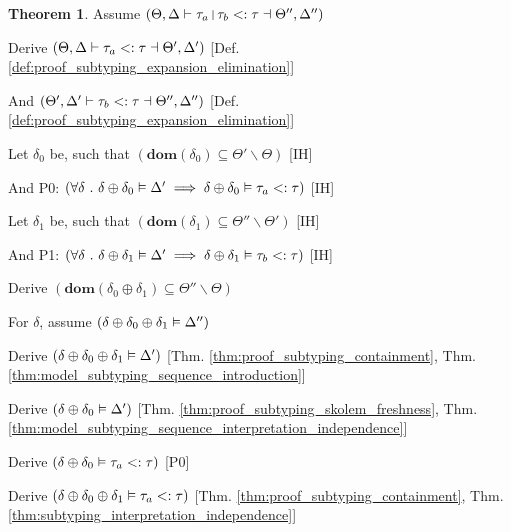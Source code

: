 \documentclass[acmsmall]{acmart}
\theoremstyle{definition}
\newtheorem{theorem}{Theorem}[section]
\begin{document}
\begin{theorem}

  \item \N Assume $(
    \Theta, \Delta \entails
    \tau_a\J{|}\tau_b \subtypes \tau
    \given \Theta'', \Delta'' 
  )$

  \item \I \N Derive $(
    \Theta, \Delta \vdash
    \tau_a <: \tau
    \dashv \Theta', \Delta'
  )$ [Def. \ref{def:proof_subtyping_expansion_elimination}]

  \item \I \N And $(
    \Theta', \Delta' \vdash
    \tau_b <: \tau
    \dashv \Theta'', \Delta''
  )$ [Def. \ref{def:proof_subtyping_expansion_elimination}]

  \item \I \N Let $\delta_0$ be, such that $(
    \textbf{dom}(\delta_0) \subseteq \Theta' \backslash \Theta
  )$ [IH]
  \item \I \N And P0: $(
    \forall \delta \ .\  
    \delta \oplus \delta_0 \vDash \Delta' 
    \implies 
    \delta \oplus \delta_0 \vDash \tau_a <: \tau
  )$ [IH]

  \item \I \N Let $\delta_1$ be, such that $(
    \textbf{dom}(\delta_1) \subseteq \Theta'' \backslash \Theta'
  )$ [IH]
  \item \I \N And P1: $(
    \forall \delta \ .\  
    \delta \oplus \delta_1 \vDash \Delta' 
    \implies 
    \delta \oplus \delta_1 \vDash \tau_b <: \tau
  )$ [IH]

  \item \I \N Derive $(
    \textbf{dom}(\delta_0 \oplus \delta_1) \subseteq \Theta'' \backslash \Theta
  )$
  \item \I \N For $\delta$, 
    assume $(\delta \oplus \delta_0 \oplus \delta_1 \vDash \Delta'')$

  \item \I\I \N Derive $(\delta \oplus \delta_0 \oplus \delta_1 \vDash \Delta')$
    [Thm. \ref{thm:proof_subtyping_containment}, Thm. \ref{thm:model_subtyping_sequence_introduction}]
  \item \I\I \N Derive $(\delta \oplus \delta_0 \vDash \Delta')$
    [Thm. \ref{thm:proof_subtyping_skolem_freshness}, Thm. \ref{thm:model_subtyping_sequence_interpretation_independence}]
  \item \I\I \N Derive $(
    \delta \oplus \delta_0 \vDash \tau_a <: \tau
  )$ [P0]

  \item \I\I \N Derive $(
    \delta \oplus \delta_0 \oplus \delta_1 \vDash \tau_a <: \tau
  )$ [Thm. \ref{thm:proof_subtyping_containment}, Thm. \ref{thm:subtyping_interpretation_independence}]


\end{theorem}
\end{document}
